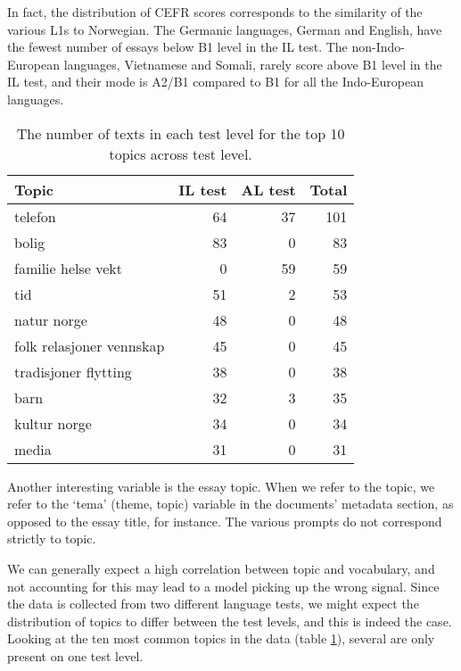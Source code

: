 In fact, the distribution of CEFR scores corresponds to the similarity of the
various \acp{L1} to Norwegian. The Germanic languages, German and English,
have the fewest number of essays below B1 level in the IL test. The
non-Indo-European languages, Vietnamese and Somali, rarely score above B1
level in the IL test, and their mode is A2/B1 compared to B1 for all the
Indo-European languages.

\begin{table}
  \centering
  \begin{tabular}{lrrr}
    \toprule
    Topic                    & IL test & AL test & Total \\
    \midrule
    telefon                  &      64 &      37 &   101 \\
    bolig                    &      83 &       0 &    83 \\
    familie helse vekt       &       0 &      59 &    59 \\
    tid                      &      51 &       2 &    53 \\
    natur norge              &      48 &       0 &    48 \\
    folk relasjoner vennskap &      45 &       0 &    45 \\
    tradisjoner flytting     &      38 &       0 &    38 \\
    barn                     &      32 &       3 &    35 \\
    kultur norge             &      34 &       0 &    34 \\
    media                    &      31 &       0 &    31 \\
    \bottomrule
  \end{tabular}
  \caption[Most common topics in ASK texts]{
    The number of texts in each test level for the top 10 topics
    across test level.
  }
  \label{tab:texts-per-topic}
\end{table}

Another interesting variable is the essay topic. When we refer to the topic,
we refer to the `tema' (theme, topic) variable in the documents' metadata
section, as opposed to the essay title, for instance. The various prompts do
not correspond strictly to topic.

We can generally expect a high correlation between topic and vocabulary, and
not accounting for this may lead to a model picking up the wrong signal.
Since the data is collected from two different language tests, we might
expect the distribution of topics to differ between the test levels, and this
is indeed the case. Looking at the ten most common topics in the data (table
\ref{tab:texts-per-topic}), several are only present on one test level.


